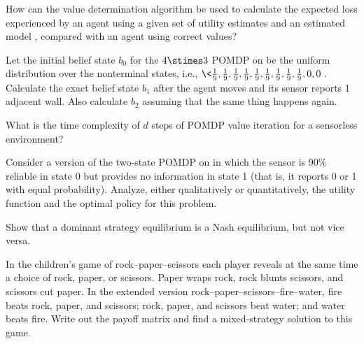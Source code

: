 \begin{exercise}%
How can the value determination algorithm
be used to calculate the expected loss experienced by an agent using a
given set of utility estimates  and an estimated model ,
compared with an agent using correct values?
\end{exercise} 



\begin{exercise}
Let the initial belief state \(b_0\) for the \(4\stimes 3\) POMDP on  be
the uniform distribution over the nonterminal states, i.e.,
\(\<\frac{1}{9},\frac{1}{9},\frac{1}{9},\frac{1}{9},\frac{1}{9},\frac{1}{9},\frac{1}{9},\frac{1}{9},\frac{1}{9},0,0\>\).
Calculate the exact belief state \(b_1\) after the agent moves  and its sensor reports 1 adjacent wall.
Also calculate \(b_2\) assuming that the same thing happens again.
\end{exercise} 

\begin{exercise}
What is the time complexity of \(d\) steps of POMDP value iteration for a sensorless environment?
\end{exercise} 

\begin{exercise}
Consider a version of the two-state POMDP on  in which 
the sensor is 90\% reliable in state 0 but provides no information in state 1 (that is, it reports 0 or 1 with equal probability).
Analyze, either qualitatively or quantitatively, the utility function and the optimal policy for this problem.
\end{exercise} 



\begin{exercise}%
Show that a dominant strategy equilibrium is a Nash equilibrium,
but not vice versa.%
\end{exercise}%

\begin{uexercise}
In the children's game of rock--paper--scissors  each player
reveals at the same time a choice of rock, paper, or scissors.  Paper
wraps rock, rock blunts scissors, and scissors cut paper. In the
extended version rock--paper--scissors--fire--water,
fire beats rock, paper, and scissors; rock, paper, and scissors
beat water; and water beats fire.  Write out the payoff matrix and
find a mixed-strategy solution to this game.
\end{uexercise} 

